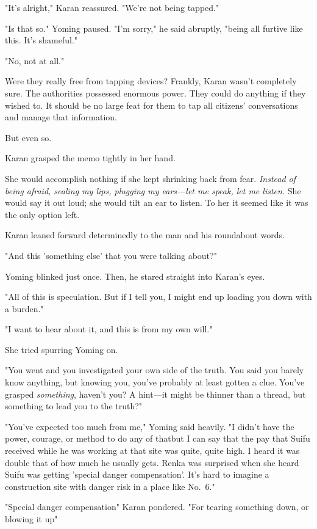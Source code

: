 "It's alright," Karan reassured. "We're not being tapped."

"Is that so." Yoming paused. "I'm sorry," he said abruptly, "being all
furtive like this. It's shameful."

"No, not at all."

Were they really free from tapping devices? Frankly, Karan wasn't
completely sure. The authorities possessed enormous power. They could do
anything if they wished to. It should be no large feat for them to tap
all citizens' conversations and manage that information.

But even so.

Karan grasped the memo tightly in her hand.

She would accomplish nothing if she kept shrinking back from fear.
\emph{Instead of being afraid, sealing my lips, plugging my ears---let me speak,
let me listen.} She would say it out loud; she would tilt an ear to
listen. To her it seemed like it was the only option left.

Karan leaned forward determinedly to the man and his roundabout words.

"And this 'something else' that you were talking about?"

Yoming blinked just once. Then, he stared straight into Karan's eyes.

"All of this is speculation. But if I tell you, I might end up loading
you down with a burden."

"I want to hear about it, and this is from my own will."

She tried spurring Yoming on.

"You went and you investigated your own side of the truth. You said you
barely know anything, but knowing you, you've probably at least gotten a
clue. You've grasped \emph{something}, haven't you? A hint---it might be thinner
than a thread, but something to lead you to the truth?"

"You've expected too much from me," Yoming said heavily. "I didn't have
the power, courage, or method to do any of that\el but I can say that
the pay that Suifu received while he was working at that site was quite,
quite high. I heard it was double that of how much he usually gets.
Renka was surprised when she heard Suifu was getting 'special danger
compensation'. It's hard to imagine a construction site with danger risk
in a place like No.~6."

"Special danger compensation\el " Karan pondered. "For tearing something
down, or blowing it up\el "

